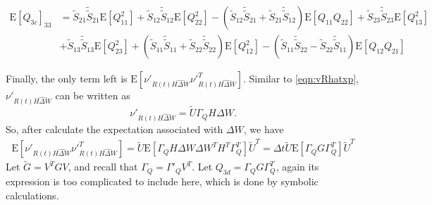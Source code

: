 \documentclass[10pt]{article}
\newcommand{\expect}[1]{\ensuremath{\mathrm{E}\left[ #1 \right]}}
\begin{document}
\begin{align}
	\expect{Q_{3c}}_{33} &= \tilde{S}_{21}\tilde{\tilde{S}}_{21}\expect{Q_{11}^2} + \tilde{S}_{12}\tilde{\tilde{S}}_{12}\expect{Q_{22}^2} - \left( \tilde{S}_{12}\tilde{\tilde{S}}_{21}+\tilde{S}_{21}\tilde{\tilde{S}}_{12} \right)\expect{Q_{11}Q_{22}} + \tilde{S}_{23}\tilde{\tilde{S}}_{23}\expect{Q_{13}^2} \nonumber \\
	&+ \tilde{S}_{13}\tilde{\tilde{S}}_{13}\expect{Q_{23}^2} + \left( \tilde{S}_{11}\tilde{\tilde{S}}_{11}+\tilde{S}_{22}\tilde{\tilde{S}}_{22} \right)\expect{Q_{12}^2} - \left( \tilde{S}_{11}\tilde{\tilde{S}}_{22}-\tilde{S}_{22}\tilde{\tilde{S}}_{11} \right)\expect{Q_{12}Q_{21}}
\end{align}

Finally, the only term left is $\expect{\nu'_{R(t)\widehat{H\Delta W}}\nu'^T_{R(t)\widehat{H\Delta W}}}$.
Similar to \eqref{eqn:vRhatxp}, $\nu'_{R(t)\widehat{H\Delta W}}$ can be written as
\begin{equation}
	\nu'_{R(t)\widehat{H\Delta W}} = \tilde{U}\Gamma_QH\Delta W.
\end{equation}
So, after calculate the expectation associated with $\Delta W$, we have
\begin{align}
	\expect{\nu'_{R(t)\widehat{H\Delta W}}\nu'^T_{R(t)\widehat{H\Delta W}}} = \tilde{U}\expect{\Gamma_QH\Delta W\Delta W^TH^T\Gamma_Q^T}\tilde{U}^T = \Delta t\tilde{U}\expect{\Gamma_QG\Gamma_Q^T}\tilde{U}^T
\end{align}
Let $\tilde{G} = V^TGV$, and recall that $\Gamma_Q = \Gamma'_QV^T$.
Let $Q_{3d} = \Gamma_QG\Gamma_Q^T$, again its expression is too complicated to include here, which is done by symbolic calculations.
\end{document}
